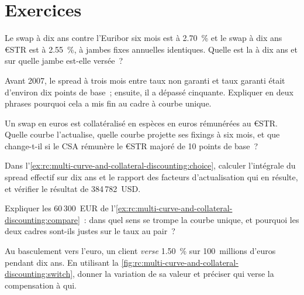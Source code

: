 \section{Exercices}

\begin{exercise}[$\star$]\label{exo:rc:multi-curve-and-collateral-discounting:1}
Le swap à dix ans contre l'Euribor six mois est à 2.70~\% et le swap à dix ans
€STR est à 2.55~\%, à jambes fixes annuelles identiques. Quelle est la  à dix ans
et sur quelle jambe est-elle versée~?
\end{exercise}

\begin{exercise}[$\star$]\label{exo:rc:multi-curve-and-collateral-discounting:2}
Avant 2007, le spread à trois mois entre taux non garanti et taux garanti était
d'environ dix points de base~; ensuite, il a dépassé cinquante. Expliquer en deux phrases
pourquoi cela a mis fin au cadre à courbe unique.
\end{exercise}

\begin{exercise}[$\star$]\label{exo:rc:multi-curve-and-collateral-discounting:3}
Un swap en euros est collatéralisé en espèces en euros rémunérées au €STR. Quelle courbe l'actualise,
quelle courbe projette ses fixings à six mois, et que change-t-il si le CSA rémunère
le €STR majoré de 10 points de base~?
\end{exercise}

\begin{exercise}[$\star\star$]\label{exo:rc:multi-curve-and-collateral-discounting:4}
Dans l'\cref{ex:rc:multi-curve-and-collateral-discounting:choice}, calculer l'intégrale
du spread effectif sur dix ans et le rapport des facteurs d'actualisation qui en
résulte, et vérifier le résultat de 384\,782~USD.
\end{exercise}

\begin{exercise}[$\star\star$]\label{exo:rc:multi-curve-and-collateral-discounting:5}
Expliquer les 60\,300~EUR de
l'\cref{ex:rc:multi-curve-and-collateral-discounting:compare}~: dans quel sens se trompe la courbe unique,
et pourquoi les deux cadres sont-ils justes sur le taux au pair~?
\end{exercise}

\begin{exercise}[$\star\star$]\label{exo:rc:multi-curve-and-collateral-discounting:6}
Au basculement vers l'euro, un client \emph{verse} 1.50~\% sur 100~millions d'euros pendant
dix ans. En utilisant la \cref{fig:rc:multi-curve-and-collateral-discounting:switch},
donner la variation de sa valeur et préciser qui verse la compensation à qui.
\end{exercise}

